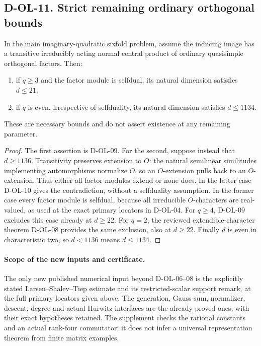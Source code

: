 \subsection*{D-OL-11. Strict remaining ordinary orthogonal bounds}

\begin{corollary}[D-OL-11]
\label{D-OL-11}
In the main imaginary-quadratic sixfold problem, assume the
inducing image has a transitive irreducibly acting normal central
product of ordinary quasisimple orthogonal factors.  Then:
\begin{enumerate}
\item if $q\ge3$ and the factor module is selfdual, its natural
dimension satisfies $d\le21$;
\item if $q$ is even, irrespective of selfduality, its natural
dimension satisfies $d\le1134$.
\end{enumerate}
These are necessary bounds and do not assert existence at any
remaining parameter.
\end{corollary}

\begin{proof}
The first assertion is D-OL-09.  For the second, suppose instead
that $d\ge1136$.  Transitivity preserves extension to $O$:
the natural semilinear similitudes implementing automorphisms
normalize $O$, so an $O$-extension pulls back to an $O$-extension.
Thus either all factor modules extend or none does.
In the latter case D-OL-10 gives the contradiction, without a
selfduality assumption.  In the former case every factor module
is selfdual, because all irreducible $O$-characters are real-valued,
as used at the exact primary locators in D-OL-04.
For $q\ge4$, D-OL-09 excludes this case already at $d\ge22$.
For $q=2$, the reviewed extendible-character theorem D-OL-08
provides the same exclusion, also at $d\ge22$.
Finally $d$ is even in characteristic two, so $d<1136$ means
$d\le1134$.
\end{proof}

\paragraph{Scope of the new inputs and certificate.}
The only new published numerical input beyond D-OL-06--08 is
the explicitly stated Larsen--Shalev--Tiep estimate and its
restricted-scalar support remark, at the full primary locators
given above.  The generation, Gauss-sum, normalizer, descent,
degree and actual Hurwitz interfaces are the already proved
ones, with their exact hypotheses retained.  The supplement
checks the rational constants and an actual rank-four commutator;
it does not infer a universal representation theorem from finite
matrix examples.
